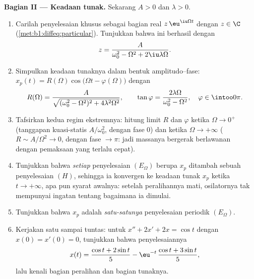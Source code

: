 \begin{problem}
\medskip
\noindent\textbf{Bagian II --- Keadaan tunak.} Sekarang $A > 0$ dan
$\lambda > 0$.
\begin{enumerate}[resume]
  \item Carilah penyelesaian khusus sebagai bagian real
        $z\,\eu^{\iu\Omega t}$ dengan $z \in \C$
        (\cref{met:b1:diffeq:particular}). Tunjukkan bahwa ini berhasil
        dengan
        \[
        z = \frac{A}{\omega_0^2 - \Omega^2 + 2\iu\lambda\Omega} .
        \]
  \item Simpulkan keadaan tunaknya dalam bentuk amplitudo--fase:
        $x_p(t) = R(\Omega)\cos\bigl(\Omega t -
        \varphi(\Omega)\bigr)$ dengan
        \[
        R(\Omega) = \frac{A}{\sqrt{(\omega_0^2 - \Omega^2)^2 +
        4\lambda^2\Omega^2}},
        \qquad
        \tan\varphi = \frac{2\lambda\Omega}{\omega_0^2 -
        \Omega^2},
        \quad \varphi \in \intoo0\pi .
        \]
  \item Tafsirkan kedua regim ekstremnya: hitung limit
        $R$ dan $\varphi$ ketika $\Omega \to 0^+$ (tanggapan
        kuasi-statis $A/\omega_0^2$, dengan fase $0$) dan ketika $\Omega \to
        +\infty$ ($R \sim A/\Omega^2 \to 0$, dengan fase $\to \pi$: jadi
        massanya bergerak berlawanan dengan pemaksaan yang terlalu cepat).
  \item Tunjukkan bahwa \emph{setiap} penyelesaian $(E_\Omega)$ berupa $x_p$
        ditambah sebuah penyelesaian $(H)$, sehingga ia konvergen ke keadaan
        tunak $x_p$ ketika $t \to +\infty$, apa pun syarat
        awalnya: setelah peralihannya mati, osilatornya tak
        mempunyai ingatan tentang bagaimana ia dimulai.
  \item Tunjukkan bahwa $x_p$ adalah \emph{satu-satunya} penyelesaian periodik
        $(E_\Omega)$.
  \item Kerjakan satu  sampai tuntas: untuk $x'' + 2x' + 2x =
        \cos t$ dengan $x(0) = x'(0) = 0$, tunjukkan bahwa penyelesaiannya
        \[
        x(t) = \frac{\cos t + 2\sin t}5
        - \eu^{-t}\,\frac{\cos t + 3\sin t}5 ,
        \]
        lalu kenali bagian peralihan dan bagian tunaknya.
\end{enumerate}


\end{problem}
